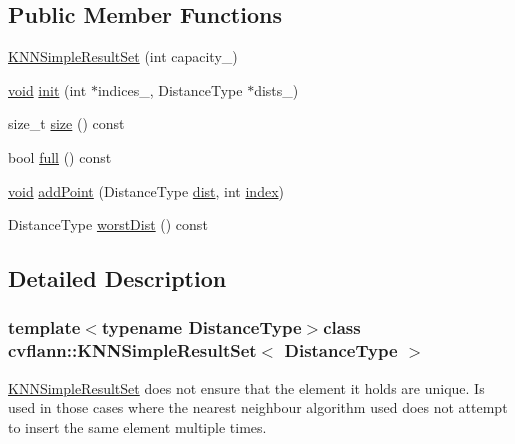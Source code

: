 \subsection*{Public Member Functions}
\begin{DoxyCompactItemize}
\item 
\hyperlink{classcvflann_1_1KNNSimpleResultSet_aeed1dccf363aaee5e508b1a4cfac7e6b}{K\-N\-N\-Simple\-Result\-Set} (int capacity\-\_\-)
\item 
\hyperlink{legacy_8hpp_a8bb47f092d473522721002c86c13b94e}{void} \hyperlink{classcvflann_1_1KNNSimpleResultSet_ad3b74564e2e5dbd947fc2f8d40a2f152}{init} (int $\ast$indices\-\_\-, Distance\-Type $\ast$dists\-\_\-)
\item 
size\-\_\-t \hyperlink{classcvflann_1_1KNNSimpleResultSet_ac696b4f905025b143390627bc011afb7}{size} () const 
\item 
bool \hyperlink{classcvflann_1_1KNNSimpleResultSet_a75521552e9211df7dc469e5b002d9c84}{full} () const 
\item 
\hyperlink{legacy_8hpp_a8bb47f092d473522721002c86c13b94e}{void} \hyperlink{classcvflann_1_1KNNSimpleResultSet_a58a9442262749276367f08c997f30c20}{add\-Point} (Distance\-Type \hyperlink{legacy_8hpp_ae895c2003a87eda49126845b7ac3688e}{dist}, int \hyperlink{core__c_8h_a750b5d744c39a06bfb13e6eb010e35d0}{index})
\item 
Distance\-Type \hyperlink{classcvflann_1_1KNNSimpleResultSet_a8c74c7c6f240d5ec9ca2e10268ab5a2a}{worst\-Dist} () const 
\end{DoxyCompactItemize}


\subsection{Detailed Description}
\subsubsection*{template$<$typename Distance\-Type$>$class cvflann\-::\-K\-N\-N\-Simple\-Result\-Set$<$ Distance\-Type $>$}

\hyperlink{classcvflann_1_1KNNSimpleResultSet}{K\-N\-N\-Simple\-Result\-Set} does not ensure that the element it holds are unique. Is used in those cases where the nearest neighbour algorithm used does not attempt to insert the same element multiple times. 

